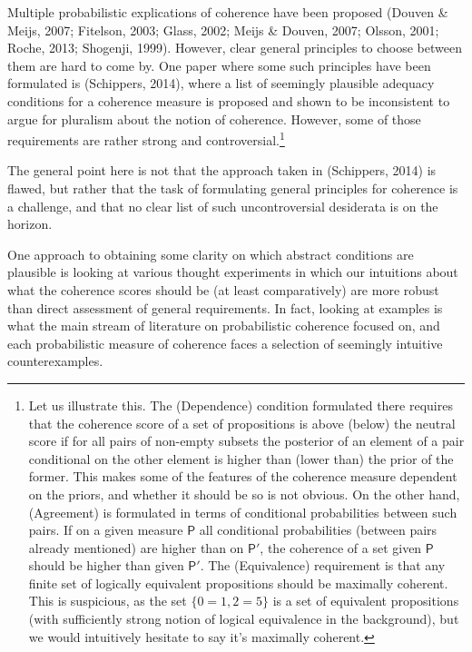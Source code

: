 \documentclass[
  10pt,
]{scrartcl}
\begin{document}
Multiple probabilistic explications of coherence have been proposed
(Douven \& Meijs, 2007; Fitelson, 2003; Glass, 2002; Meijs \& Douven, 2007; Olsson, 2001; Roche, 2013; Shogenji, 1999). However, clear general principles to choose between them are hard to come by. One paper where some such principles have been formulated is (Schippers, 2014), where a list of seemingly plausible adequacy conditions for a coherence measure is proposed and shown to be inconsistent to argue for pluralism about the notion of coherence. However, some of those requirements are rather strong and controversial.\footnote{Let us illustrate this. The (Dependence) condition formulated there requires that the coherence score of a set of propositions is above (below) the neutral score if for all pairs of non-empty subsets the posterior of an element of a pair conditional on the other element is higher than (lower than) the prior of the former. This makes some of the features of the coherence measure dependent on the priors, and whether it should be so is not obvious. On the other hand, (Agreement) is formulated in terms of conditional probabilities between such pairs. If on a given measure \(\mathsf{P}\) all conditional probabilities (between pairs already mentioned) are higher than on \(\mathsf{P}'\), the coherence of a set given \(\mathsf{P}\) should be higher than given \(\mathsf{P}'\). The (Equivalence) requirement is that any finite set of logically equivalent propositions should be maximally coherent. This is suspicious, as the set \(\{ 0= 1, 2 = 5\}\) is a set of equivalent propositions (with sufficiently strong notion of logical equivalence in the background), but we would intuitively hesitate to say it's maximally coherent.}

The general point here is not that the approach taken in (Schippers, 2014) is flawed, but rather that the task of formulating general principles for coherence is a challenge, and that no clear list of such uncontroversial desiderata is on the horizon.

One approach to obtaining some clarity on which abstract conditions are plausible is looking at various thought experiments in which our intuitions about what the coherence scores should be (at least comparatively) are more robust than direct assessment of general requirements. In fact, looking at examples is what the main stream of literature on probabilistic coherence focused on, and each probabilistic measure of coherence faces a selection of seemingly intuitive counterexamples.
\end{document}
